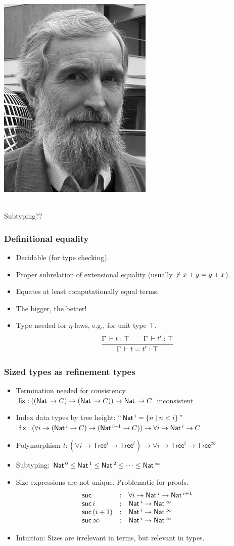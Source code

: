 \documentclass[t,fleqn]{beamer}
\makeatletter
\renewcommand{\ru}[2]{\dfrac{\begin{array}[b]{@{}c@{}} #1 \end{array}}{\begin{array}[t]{@{}l@{}} #2 \end{array}}}
\newcommand{\Tree}{\mathsf{Tree}}
\newcommand{\cAnn}{\color{red!80!black}}%
\renewcommand{\emph}[1]{{\cAnn#1}}
\newcommand{\mlsays}[1]{
\begin{frame}%
  \begin{minipage}[c]{0.5\linewidth}
   \includegraphics[height=0.9\textheight]{martin-loef-bw.png}
  \end{minipage}%
  \begin{minipage}[c]{0.5\linewidth}
   \begin{center}
     \bla \\[8ex]
     \Huge #1
   \end{center}
  \end{minipage}
\end{frame}
}
\makeatother
\begin{document}
\mlsays{Subtyping??}

\begin{frame}%
  \frametitle{Definitional equality}
  \begin{itemize}
  \item Decidable (for type checking).
  \item Proper subrelation of extensional equality (usually
    $\not\,\vdash x + y = y + x$).
  \item Equates at least computationally equal terms.
  \item The bigger, the better!
  \item Type needed for $\eta$-laws, e.g., for unit type $\top$.
\[
  \ru{\Gamma \der t : \top \qquad \Gamma \der t' : \top
    }{\Gamma \der t = t' : \top}
\]
\vspace{-2ex}
  \end{itemize}
\end{frame}




\begin{frame}%
  \frametitle{Sized types as refinement types}
  \begin{itemize}
  \item Termination needed for consistency.\\
    $\mathsf{fix} : ((\mathsf{Nat}\, \to C) \to (\mathsf{Nat}\, \to C)) \to \mathsf{Nat}\, \to C$
    inconsistent
  \item Index data types by tree height: ``$\mathsf{Nat}\,^i = \{ n \mid n < i \}$'' \\
    $\mathsf{fix} : (\forall i \to (\mathsf{Nat}\,^i \to C) \to (\mathsf{Nat}\,^{i+1} \to C))
    \to \forall i \to \mathsf{Nat}\,^i \to C$
  \item Polymorphism $t : (\forall i \to \Tree^i \to \Tree^i) \to
    \forall i \to \Tree^i \to \Tree^\infty$
  \item Subtyping: $\mathsf{Nat}\,^0 \leq \mathsf{Nat}\,^1 \leq \mathsf{Nat}\,^2 \leq \dots \leq
    \mathsf{Nat}\,^\infty$
  \item Size expressions are not unique.  Problematic for proofs.
\[
\begin{array}{lcl}
  \mathsf{suc}          & : & \forall i \to \mathsf{Nat}\,^i \to \mathsf{Nat}\,^{i + 1} \\
  \mathsf{suc}\,i       & : & \mathsf{Nat}\,^i \to \mathsf{Nat}\,^\infty \\
  \mathsf{suc}\,(i + 1) & : & \mathsf{Nat}\,^i \to \mathsf{Nat}\,^\infty \\
  \mathsf{suc}\,\infty  & : & \mathsf{Nat}\,^i \to \mathsf{Nat}\,^\infty \\
\end{array}
\]
\vspace{-2ex}
  \item Intuition: Sizes are \emph{irrelevant} in terms, but \emph{relevant} in types.
  \end{itemize}
\end{frame}
\end{document}
